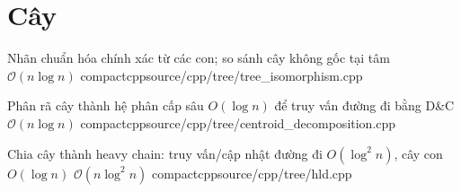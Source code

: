 \section{Cây}

{Nhãn chuẩn hóa chính xác từ các con; so sánh cây không gốc tại tâm}
{$\mathcal{O}(n \log n)$}
{compactcpp}{source/cpp/tree/tree_isomorphism.cpp}

{Phân rã cây thành hệ phân cấp sâu $O(\log n)$ để truy vấn đường đi bằng D\&C}
{$\mathcal{O}(n \log n)$}
{compactcpp}{source/cpp/tree/centroid_decomposition.cpp}

{Chia cây thành heavy chain: truy vấn/cập nhật đường đi $O(\log^2 n)$, cây con $O(\log n)$}
{$\mathcal{O}(n \log^2 n)$}
{compactcpp}{source/cpp/tree/hld.cpp}

